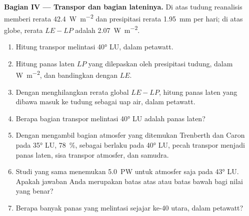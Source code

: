 \begin{problem}
\medskip
\noindent\textbf{Bagian IV --- Transpor dan bagian lateninya.} Di atas tudung reanalisis
memberi  rerata \qty{42.4}{W.m^{-2}} dan presipitasi rerata
\qty{1.95}{mm} per hari; di atas globe, rerata $LE - LP$ adalah
\qty{2.07}{W.m^{-2}}.
\begin{enumerate}[resume]
  \item Hitung transpor melintasi \ang{40} LU, dalam petawatt.
  \item Hitung panas laten $LP$ yang dilepaskan oleh presipitasi tudung, dalam
        \unit{W.m^{-2}}, dan bandingkan dengan $LE$.
  \item Dengan menghilangkan rerata global $LE - LP$, hitung panas laten yang dibawa
        masuk ke tudung sebagai uap air, dalam petawatt.
  \item Berapa bagian transpor melintasi \ang{40} LU adalah panas laten?
  \item Dengan mengambil bagian atmosfer yang ditemukan Trenberth dan Caron pada
        \ang{35} LU, \qty{78}{\percent}, sebagai berlaku pada \ang{40} LU, pecah transpor
        menjadi panas laten, sisa transpor atmosfer, dan samudra.
  \item Studi yang sama menemukan \qty{5.0}{PW} untuk atmosfer saja pada
        \ang{43} LU. Apakah jawaban Anda merupakan batas atas atau batas bawah bagi nilai yang benar?
  \item Berapa banyak panas yang melintasi sejajar ke-40 utara, dalam petawatt?
\end{enumerate}
\end{problem}
